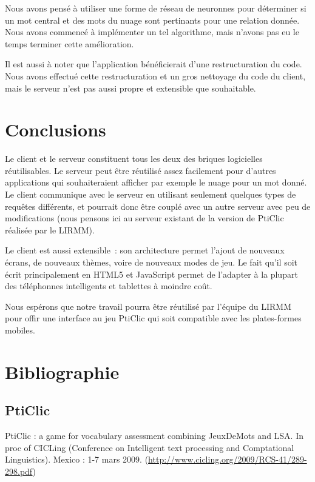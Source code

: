 \documentclass[a4paper,11pt,french]{article}
\begin{document}
{Nous avons pensé à utiliser une forme de réseau de neuronnes pour déterminer si un mot central et des mots du nuage sont pertinants pour une
relation donnée. Nous avons commencé à implémenter un tel algorithme, mais n'avons pas eu le temps terminer cette amélioration.

Il est aussi à noter que l'application bénéficierait d'une restructuration du code. Nous avons effectué cette restructuration et un gros
nettoyage du code du client, mais le serveur n'est pas aussi propre et extensible que souhaitable.

\section{Conclusions}

Le client et le serveur constituent tous les deux des briques logicielles réutilisables. Le serveur peut être réutilisé assez facilement
pour d'autres applications qui souhaiteraient afficher par exemple le nuage pour un mot donné. Le client communique avec le serveur en
utilisant seulement quelques types de requêtes différents, et pourrait donc être couplé avec un autre serveur avec peu de modifications
(nous pensons ici au serveur existant de la version de PtiClic réalisée par le LIRMM).

Le client est aussi extensible~: son architecture permet l'ajout de nouveaux écrans, de nouveaux thèmes, voire de nouveaux modes de jeu. Le
fait qu'il soit écrit principalement en HTML5 et JavaScript permet de l'adapter à la plupart des téléphonnes intelligents et tablettes à
moindre coût.

Nous espérons que notre travail pourra être réutilisé par l'équipe du LIRMM pour offir une interface au jeu PtiClic qui soit compatible avec
les plates-formes mobiles.

\newpage


\section{Bibliographie}
\subsection{PtiClic}

PtiClic : a game for vocabulary assessment combining JeuxDeMots and LSA. In proc of CICLing (Conference on Intelligent text processing and Comptational Linguistics). Mexico : 1-7 mars 2009. (\url{http://www.cicling.org/2009/RCS-41/289-298.pdf})


}
\end{document}
